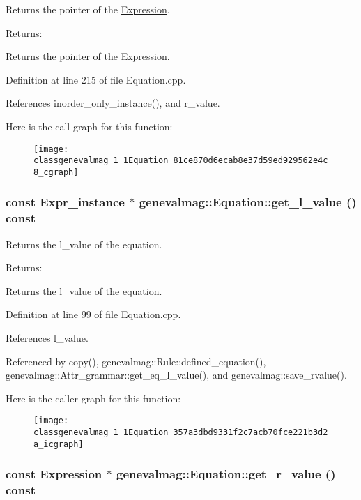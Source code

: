 Returns the pointer of the \hyperlink{classgenevalmag_1_1Expression}{Expression}. \begin{Desc}
\item[Returns:]\end{Desc}
Returns the pointer of the \hyperlink{classgenevalmag_1_1Expression}{Expression}. 

Definition at line 215 of file Equation.cpp.

References inorder\_\-only\_\-instance(), and r\_\-value.

Here is the call graph for this function:\nopagebreak
\begin{figure}[H]
\begin{center}
\leavevmode
\texttt{[image: classgenevalmag\_1\_1Equation\_81ce870d6ecab8e37d59ed929562e4c8\_cgraph]}
\end{center}
\end{figure}
\hypertarget{classgenevalmag_1_1Equation_357a3dbd9331f2c7acb70fce221b3d2a}{
\subsubsection[{get\_\-l\_\-value}]{\setlength{\rightskip}{0pt plus 5cm}const {\bf Expr\_\-instance} $\ast$ genevalmag::Equation::get\_\-l\_\-value () const}}
\label{classgenevalmag_1_1Equation_357a3dbd9331f2c7acb70fce221b3d2a}


Returns the l\_\-value of the equation. \begin{Desc}
\item[Returns:]\end{Desc}
Returns the l\_\-value of the equation. 

Definition at line 99 of file Equation.cpp.

References l\_\-value.

Referenced by copy(), genevalmag::Rule::defined\_\-equation(), genevalmag::Attr\_\-grammar::get\_\-eq\_\-l\_\-value(), and genevalmag::save\_\-rvalue().

Here is the caller graph for this function:\nopagebreak
\begin{figure}[H]
\begin{center}
\leavevmode
\texttt{[image: classgenevalmag\_1\_1Equation\_357a3dbd9331f2c7acb70fce221b3d2a\_icgraph]}
\end{center}
\end{figure}
\hypertarget{classgenevalmag_1_1Equation_875d86207681edfa874a5fca11a671be}{
\subsubsection[{get\_\-r\_\-value}]{\setlength{\rightskip}{0pt plus 5cm}const {\bf Expression} $\ast$ genevalmag::Equation::get\_\-r\_\-value () const}}
\label{classgenevalmag_1_1Equation_875d86207681edfa874a5fca11a671be}


